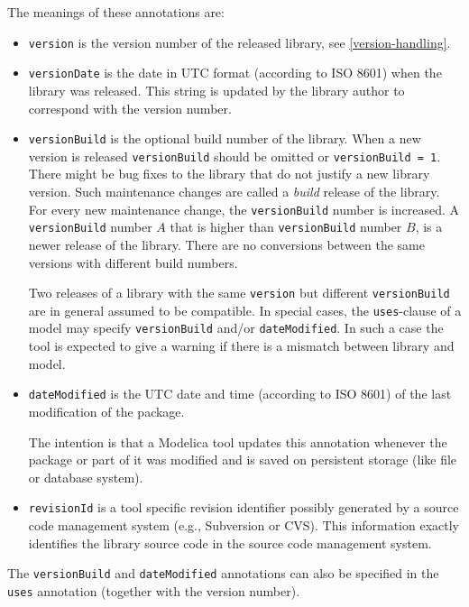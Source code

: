 The meanings of these annotations are:
\begin{itemize}
\item
  \lstinline!version! is the version number of the released library,
  see \cref{version-handling}.
\item
  \lstinline!versionDate! is the date in UTC format (according to ISO 8601) when the library was released.
  This string is updated by the library author to correspond with the version number.
\item
  \lstinline!versionBuild! is the optional build number of the library.
  When a new version is released \lstinline!versionBuild! should be omitted or \lstinline!versionBuild = 1!.
  There might be bug fixes to the library that do not justify a new library version.
  Such maintenance changes are called a \emph{build} release of the library.
  For every new maintenance change, the \lstinline!versionBuild! number is increased.
  A \lstinline!versionBuild! number $A$ that is higher than \lstinline!versionBuild! number $B$, is a newer release of the library.
  There are no conversions between the same versions with different build numbers.

  Two releases of a library with the same \lstinline!version! but different \lstinline!versionBuild! are in general assumed to be compatible.
  In special cases, the \lstinline!uses!-clause of a model may specify \lstinline!versionBuild! and/or \lstinline!dateModified!.
  In such a case the tool is expected to give a warning if there is a mismatch between library and model.
\item
  \lstinline!dateModified! is the UTC date and time (according to ISO 8601) of the last modification of the package.

  \begin{nonnormative}
  The intention is that a Modelica tool updates this annotation whenever the package or part of it was modified and is saved on persistent storage (like file or database system).
  \end{nonnormative}
\item
  \lstinline!revisionId! is a tool specific revision identifier possibly generated by a source code management system (e.g., Subversion or CVS).
  This information exactly identifies the library source code in the source code management system.
\end{itemize}

The \lstinline!versionBuild! and \lstinline!dateModified! annotations can also be specified in the \lstinline!uses! annotation (together with the version number).

